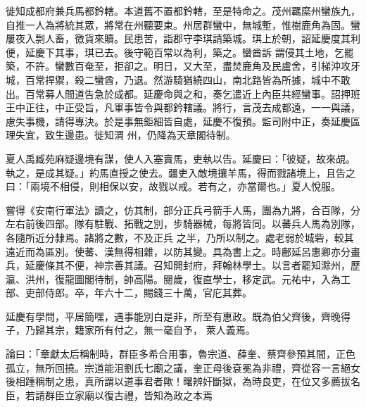 \begin{pinyinscope}
 徙知成都府兼兵馬都鈐轄。本道舊不置都鈐轄，至是特命之。茂州羈縻州蠻族九，自推一人為將統其眾，將常在州聽要束。州居群蠻中，無城塹，惟樹鹿角為固。蠻屢夜入剽人畜，徼貨來贖。民患苦，詣郡守李琪請築城。琪上於朝，詔延慶度其利便，延慶下其事，琪已去。後守範百常以為利，築之。蠻酋訴
 謂侵其土地，乞罷築，不許。蠻數百奄至，拒卻之。明日，又大至，盡焚鹿角及民盧舍，引梯沖攻牙城，百常捍禦，殺二蠻酋，乃退。然游騎猶繞四山，南北路皆為所據，城中不敢出。百常募人間道告急於成都。延慶命與之和，奏乞遣近上內臣共經蠻事。詔押班王中正往，中正受旨，凡軍事皆令與都鈐轄議。將行，言茂去成都遠，一一與議，慮失事機，請得專決。於是事無鉅細皆自處，延慶不復預。監司附中正，奏延慶區理失宜，致生邊患。徙知渭
 州，仍降為天章閣待制。



 夏人禹臧苑麻疑邊境有謀，使人入塞賣馬，吏執以告。延慶曰：「彼疑，故來覘。執之，是成其疑。」約馬直授之使去。疆吏入敵境攘羊馬，得而戮諸境上，且告之曰：「兩境不相侵，則相保以安，故戮以戒。若有之，亦當爾也。」夏人悅服。



 嘗得《安南行軍法》讀之，仿其制，部分正兵弓箭手人馬，團為九將，合百隊，分左右前後四部。隊有駐戰、拓戰之別，步騎器械，每將皆同。以蕃兵人馬為別隊，各隨所近分隸焉。諸將之數，不及正兵
 之半，乃所以制之。處老弱於城砦，較其遠近而為區別。使蕃、漢無得相雜，以防其變。具為書上之。時鄜延呂惠卿亦分畫兵，延慶條其不便，神宗善其議。召知開封府，拜翰林學士。以言者罷知滁州，歷瀛、洪州，復龍圖閣待制，帥高陽。閱歲，復直學士，移定武。元祐中，入為工部、吏部侍郎。卒，年六十二，賜錢三十萬，官庀其葬。



 延慶有學問，平居簡嘿，遇事能別白是非，所至有惠政。既為伯父齊後，齊晚得子，乃歸其宗，籍家所有付之，無一毫自予，
 萊人義焉。



 論曰：「章獻太后稱制時，群臣多希合用事，魯宗道、薛奎、蔡齊參預其間，正色孤立，無所回撓。宗道能沮劉氏七廟之議，奎正母後袞冕為非禮，齊從容一言絕女後相踵稱制之患，真所謂以道事君者歟！曙辨奸斷獄，為時良吏，在位又多薦拔名臣，若請群臣立家廟以復古禮，皆知為政之本焉



\end{pinyinscope}